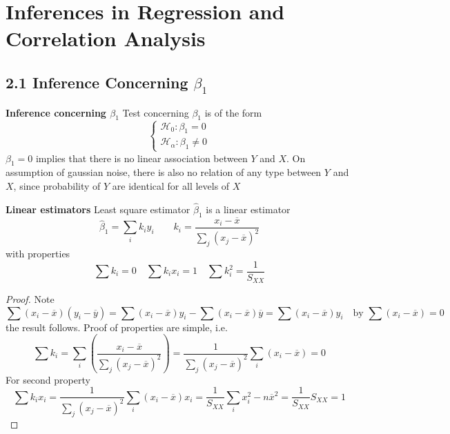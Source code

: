 \documentclass[11pt]{article}
\begin{document}
\section*{Inferences in Regression and Correlation Analysis}


\subsection*{2.1 Inference Concerning $\beta_1$}


\begin{defn*}
	\textbf{Inference concerning $\beta_1$} Test concerning $\beta_1$ is of the form 
	\[
		\begin{cases*}
			\mathcal{H}_0: \beta_1 = 0\\
			\mathcal{H}_{\alpha}: \beta_1 \neq 0  
		\end{cases*}
	\]
	$\beta_1 = 0$ implies that there is no linear association between $Y$ and $X$. On assumption of gaussian noise, there is also no relation of any type between $Y$ and $X$, since probability of $Y$ are identical for all levels of $X$ 
\end{defn*} 


\begin{defn*}
	\textbf{Linear estimators} Least square estimator $\hat{\beta}_1$ is a linear estimator
	\[
		\hat{\beta}_1 = \sum_i k_i y_i \quad \quad k_i = \frac{x_i -\overline{x}}{\sum_j (x_j - \overline{x})^2}
	\]
	with properties
	\[
		\sum k_i = 0 \quad \sum k_i x_i = 1 \quad \sum k_i^2 = \frac{1}{S_{XX}}
	\]
	\begin{proof}
		Note
		\[
			\sum (x_i - \overline{x})(y_i - \overline{y}) = \sum (x_i - \overline{x})y_i - \sum (x_i - \overline{x})\overline{y} = \sum (x_i - \overline{x})y_i \quad \text{by $\sum (x_i - \overline{x}) = 0$}
		\]
		the result follows. Proof of properties are simple, i.e.
		\[
			\sum k_i = \sum_i \left( \frac{x_i - \overline{x}}{\sum_j (x_j - \overline{x})^2} \right) 
			= \frac{1}{\sum_j (x_j - \overline{x})^2} \sum_i (x_i - \overline{x}) = 0
		\]
		For second property
		\[
			\sum k_i x_i 
			= \frac{1}{\sum_j (x_j - \overline{x})^2} \sum_i (x_i - \overline{x}) x_i 
			= \frac{1}{S_{XX}} \sum_i x_i^2 - n\overline{x}^2
			= \frac{1}{S_{XX}} S_{XX}
			= 1
		\]
	\end{proof}
\end{defn*}
\end{document}
